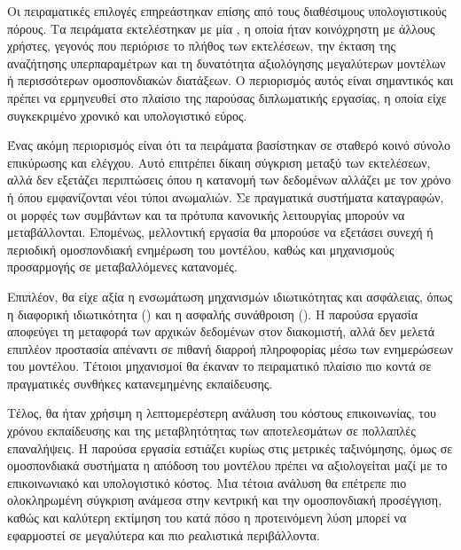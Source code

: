 Οι πειραματικές επιλογές επηρεάστηκαν επίσης από τους διαθέσιμους υπολογιστικούς πόρους. Τα πειράματα εκτελέστηκαν με μία , η οποία ήταν κοινόχρηστη με άλλους χρήστες, γεγονός που περιόρισε το πλήθος των εκτελέσεων, την έκταση της αναζήτησης υπερπαραμέτρων και τη δυνατότητα αξιολόγησης μεγαλύτερων μοντέλων ή περισσότερων ομοσπονδιακών διατάξεων. Ο περιορισμός αυτός είναι σημαντικός και πρέπει να ερμηνευθεί στο πλαίσιο της παρούσας διπλωματικής εργασίας, η οποία είχε συγκεκριμένο χρονικό και υπολογιστικό εύρος.

Ένας ακόμη περιορισμός είναι ότι τα πειράματα βασίστηκαν σε σταθερό κοινό σύνολο επικύρωσης και ελέγχου. Αυτό επιτρέπει δίκαιη σύγκριση μεταξύ των εκτελέσεων, αλλά δεν εξετάζει περιπτώσεις όπου η κατανομή των δεδομένων αλλάζει με τον χρόνο ή όπου εμφανίζονται νέοι τύποι ανωμαλιών. Σε πραγματικά συστήματα καταγραφών, οι μορφές των συμβάντων και τα πρότυπα κανονικής λειτουργίας μπορούν να μεταβάλλονται. Επομένως, μελλοντική εργασία θα μπορούσε να εξετάσει συνεχή ή περιοδική ομοσπονδιακή ενημέρωση του μοντέλου, καθώς και μηχανισμούς προσαρμογής σε μεταβαλλόμενες κατανομές.

Επιπλέον, θα είχε αξία η ενσωμάτωση μηχανισμών ιδιωτικότητας και ασφάλειας, όπως η διαφορική ιδιωτικότητα () και η ασφαλής συνάθροιση (). Η παρούσα εργασία αποφεύγει τη μεταφορά των αρχικών δεδομένων στον διακομιστή, αλλά δεν μελετά επιπλέον προστασία απέναντι σε πιθανή διαρροή πληροφορίας μέσω των ενημερώσεων του μοντέλου. Τέτοιοι μηχανισμοί θα έκαναν το πειραματικό πλαίσιο πιο κοντά σε πραγματικές συνθήκες κατανεμημένης εκπαίδευσης.

Τέλος, θα ήταν χρήσιμη η λεπτομερέστερη ανάλυση του κόστους επικοινωνίας, του χρόνου εκπαίδευσης και της μεταβλητότητας των αποτελεσμάτων σε πολλαπλές επαναλήψεις. Η παρούσα εργασία εστιάζει κυρίως στις μετρικές ταξινόμησης, όμως σε ομοσπονδιακά συστήματα η απόδοση του μοντέλου πρέπει να αξιολογείται μαζί με το επικοινωνιακό και υπολογιστικό κόστος. Μια τέτοια ανάλυση θα επέτρεπε πιο ολοκληρωμένη σύγκριση ανάμεσα στην κεντρική και την ομοσπονδιακή προσέγγιση, καθώς και καλύτερη εκτίμηση του κατά πόσο η προτεινόμενη λύση μπορεί να εφαρμοστεί σε μεγαλύτερα και πιο ρεαλιστικά περιβάλλοντα.
